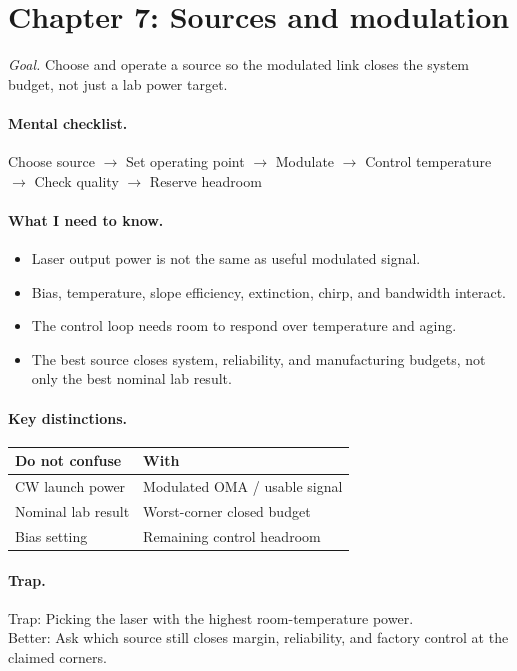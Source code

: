 \clearpage
\section{Chapter 7: Sources and modulation}
\label{sec:cheat-ch5}

\textit{Goal.} Choose and operate a source so the modulated link closes the
system budget, not just a lab power target.

\paragraph{Mental checklist.}
Choose source $\rightarrow$ Set operating point $\rightarrow$ Modulate
$\rightarrow$ Control temperature $\rightarrow$ Check quality $\rightarrow$
Reserve headroom

\paragraph{What I need to know.}
\begin{itemize}
\item Laser output power is not the same as useful modulated signal.
\item Bias, temperature, slope efficiency, extinction, chirp, and bandwidth
      interact.
\item The control loop needs room to respond over temperature and aging.
\item The best source closes system, reliability, and manufacturing budgets,
      not only the best nominal lab result.
\end{itemize}

\paragraph{Key distinctions.}
\begin{center}
\footnotesize
\begin{tabular}{@{}ll@{}}
\toprule
Do not confuse & With \\
\midrule
CW launch power & Modulated OMA / usable signal \\
Nominal lab result & Worst-corner closed budget \\
Bias setting & Remaining control headroom \\
\bottomrule
\end{tabular}
\end{center}

\paragraph{Trap.}
Trap: Picking the laser with the highest room-temperature power.\\
Better: Ask which source still closes margin, reliability, and factory control
at the claimed corners.

